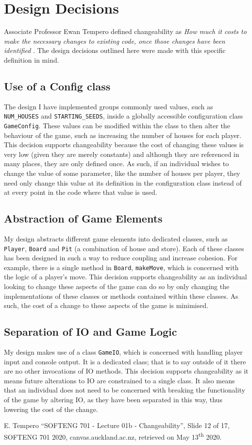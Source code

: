 \documentclass[10pt, a4paper, conference]{IEEEtran}
\begin{document}
\section{Design Decisions}

Associate Professor Ewan Tempero defined changeability as 
\textit{How much it costs to make the necessary changes to existing code, once those
changes have been identified} \cite{changeability}. The design decisions
outlined here were made with this specific definition in mind.

\subsection{Use of a Config class}
The design I have implemented groups commonly used values, such as
\texttt{NUM\_HOUSES} and \texttt{STARTING\_SEEDS}, inside a globally
accessible configuration class \texttt{GameConfig}. These values can be modified
within the class to then alter the behaviour of the game, such as increasing
the number of houses for each player.
This decision supports changeability because the cost of changing these values is very
low (given they are merely constants) and although they are referenced in many
places, they are only defined once. As such, if an individual wishes to change
the value of some parameter, like the number of houses per player, they need
only change this value at its definition in the configuration class instead of
at every point in the code where that value is used.

\subsection{Abstraction of Game Elements}
My design abstracts different game elements into dedicated classes, such as
\texttt{Player}, \texttt{Board} and \texttt{Pit} (a combination of house and
store). Each of these classes has been designed in such a way to reduce
coupling and increase cohesion. For example, there is a single method in 
\texttt{Board}, \texttt{makeMove}, which is concerned with the logic of 
a player's move.
This decision supports changeability as an individual looking to change
these aspects of the game can do so by only changing the implementations of
these classes or methods contained within these classes. As such, the cost
of a change to these aspects of the game is minimised.

\subsection{Separation of IO and Game Logic}
My design makes use of a class \texttt{GameIO}, which 
is concerned with handling player input and console output. It is a dedicated
class; that is to say outside of it there are no other invocations of IO
methods. 
This decision supports changeability as it means future alterations to IO are
constrained to a single class. It also means that an individual does not need
to be concerned with breaking the functionality of the game by altering IO, as
they have been separated in this way, thus lowering the cost of the change.

\begin{thebibliography}{00}
 E. Tempero ``SOFTENG 701 - Lecture 01b
  - Changeability'', Slide 12 of 17, SOFTENG 701 2020, canvas.auckland.ac.nz,
    retrieved on May 13\textsuperscript{th} 2020.
\end{thebibliography}
\end{document}
